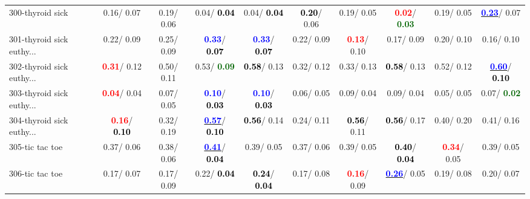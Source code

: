 \begin{table}[h]
\begin{center}
{\begin{tabular}{lc|c|c|c|c|c|c|c|c}
300-thyroid sick &   0.16/  0.07 &   0.19/  0.06 &   0.04/\textcolor{black}{\textbf{  0.04}} &   0.04/\textcolor{black}{\textbf{  0.04}} & \textcolor{black}{\textbf{  0.20}}/  0.06 &   0.19/  0.05 & \textcolor{red}{\textbf{  0.02}}/\textcolor{darkgreen}{\textbf{  0.03}} &   0.19/  0.05 & \underline{\textcolor{blue}{\textbf{  0.23}}}/  0.07 \\
301-thyroid sick euthy... &   0.22/  0.09 &   0.25/  0.09 & \textcolor{blue}{\textbf{  0.33}}/\textcolor{black}{\textbf{  0.07}} & \textcolor{blue}{\textbf{  0.33}}/\textcolor{black}{\textbf{  0.07}} &   0.22/  0.09 & \textcolor{red}{\textbf{  0.13}}/  0.10 &   0.17/  0.09 &   0.20/  0.10 &   0.16/  0.10 \\
302-thyroid sick euthy... & \textcolor{red}{\textbf{  0.31}}/  0.12 &   0.50/  0.11 &   0.53/\textcolor{darkgreen}{\textbf{  0.09}} & \textcolor{black}{\textbf{  0.58}}/  0.13 &   0.32/  0.12 &   0.33/  0.13 & \textcolor{black}{\textbf{  0.58}}/  0.13 &   0.52/  0.12 & \underline{\textcolor{blue}{\textbf{  0.60}}}/\textcolor{black}{\textbf{  0.10}} \\ \hline
303-thyroid sick euthy... & \textcolor{red}{\textbf{  0.04}}/  0.04 &   0.07/  0.05 & \textcolor{blue}{\textbf{  0.10}}/\textcolor{black}{\textbf{  0.03}} & \textcolor{blue}{\textbf{  0.10}}/\textcolor{black}{\textbf{  0.03}} &   0.06/  0.05 &   0.09/  0.04 &   0.09/  0.04 &   0.05/  0.05 &   0.07/\textcolor{darkgreen}{\textbf{  0.02}} \\
304-thyroid sick euthy... & \textcolor{red}{\textbf{  0.16}}/\textcolor{black}{\textbf{  0.10}} &   0.32/  0.19 & \underline{\textcolor{blue}{\textbf{  0.57}}}/\textcolor{black}{\textbf{  0.10}} & \textcolor{black}{\textbf{  0.56}}/  0.14 &   0.24/  0.11 & \textcolor{black}{\textbf{  0.56}}/  0.11 & \textcolor{black}{\textbf{  0.56}}/  0.17 &   0.40/  0.20 &   0.41/  0.16 \\
305-tic tac toe &   0.37/  0.06 &   0.38/  0.06 & \underline{\textcolor{blue}{\textbf{  0.41}}}/\textcolor{black}{\textbf{  0.04}} &   0.39/  0.05 &   0.37/  0.06 &   0.39/  0.05 & \textcolor{black}{\textbf{  0.40}}/\textcolor{black}{\textbf{  0.04}} & \textcolor{red}{\textbf{  0.34}}/  0.05 &   0.39/  0.05 \\
306-tic tac toe &   0.17/  0.07 &   0.17/  0.09 &   0.22/\textcolor{black}{\textbf{  0.04}} & \textcolor{black}{\textbf{  0.24}}/\textcolor{black}{\textbf{  0.04}} &   0.17/  0.08 & \textcolor{red}{\textbf{  0.16}}/  0.09 & \underline{\textcolor{blue}{\textbf{  0.26}}}/  0.05 &   0.19/  0.08 &   0.20/  0.07 \\

\end{tabular}}
\end{center}
\end{table}
